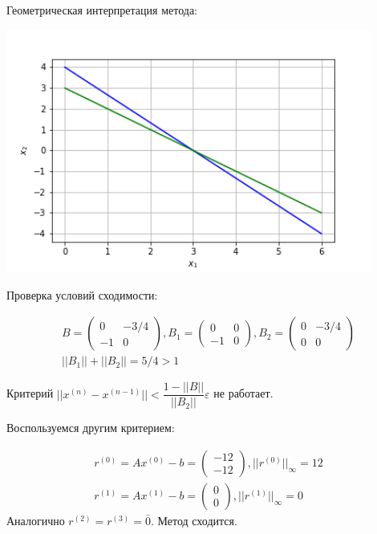 \documentclass[a4paper,12pt]{report} %
\begin{document}
Геометрическая интерпретация метода:

\noindent\includegraphics[height=8cm]{regular_calc_12.png}

Проверка условий сходимости:

\begin{gather*}
	B = 
	\begin{pmatrix}
		0 & -3/4 \\
		-1 & 0
	\end{pmatrix},
	B_1 =
	\begin{pmatrix}
		0 & 0 \\
		-1 & 0
	\end{pmatrix},
	B_2 = 
	\begin{pmatrix}
		0 & -3/4 \\
		0 & 0
	\end{pmatrix} \\
	||B_1|| + ||B_2|| = 5/4 > 1
\end{gather*}

Критерий $||x^{(n)} - x^{(n-1)}|| < \dfrac{1 - ||B||}{||B_2||} \varepsilon$ не работает.

Воспользуемся другим критерием:

\begin{gather*}
	r^{(0)} = Ax^{(0)} - b = \begin{pmatrix} -12 \\ -12 \end{pmatrix}, ||r^{(0)}||_{\infty} = 12 \\
	r^{(1)} = Ax^{(1)} - b = \begin{pmatrix} 0 \\ 0 \end{pmatrix}, ||r^{(1)}||_{\infty} = 0 
\end{gather*}
Аналогично $r^{(2)} = r^{(3)} =\bar 0$. Метод сходится.
\end{document}
